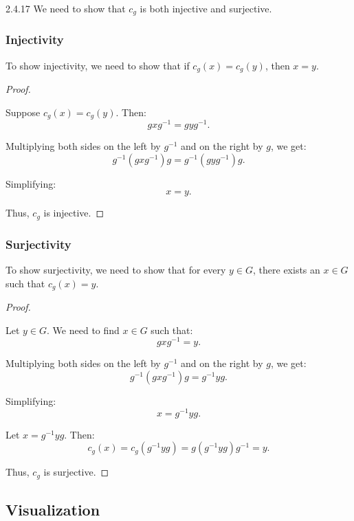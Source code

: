 \documentclass[12pt]{amsart}
\theoremstyle{definition}
\numberwithin{equation}{section}
\begin{document}
\begin{exercise}{2.4.17}
    We need to show that \(c_g\) is both injective and surjective.
    
    \subsubsection*{Injectivity}
    
    To show injectivity, we need to show that if \(c_g(x) = c_g(y)\), then \(x = y\).
    
    \begin{proof} \(\)
    
    Suppose \(c_g(x) = c_g(y)\). Then:
    \[
    gxg^{-1} = gyg^{-1}.
    \]
    
    Multiplying both sides on the left by \(g^{-1}\) and on the right by \(g\), we get:
    \[
    g^{-1}(gxg^{-1})g = g^{-1}(gyg^{-1})g.
    \]
    
    Simplifying:
    \[
    x = y.
    \]
    
    Thus, \(c_g\) is injective.
    
    \end{proof}
    
    \subsubsection*{Surjectivity}
    
    To show surjectivity, we need to show that for every \(y \in G\), there exists an \(x \in G\) such that \(c_g(x) = y\).
    
    \begin{proof} \(\)
    
    Let \(y \in G\). We need to find \(x \in G\) such that:
    \[
    gxg^{-1} = y.
    \]
    
    Multiplying both sides on the left by \(g^{-1}\) and on the right by \(g\), we get:
    \[
    g^{-1}(gxg^{-1})g = g^{-1}yg.
    \]
    
    Simplifying:
    \[
    x = g^{-1}yg.
    \]
    
    Let \(x = g^{-1}yg\). Then:
    \[
    c_g(x) = c_g(g^{-1}yg) = g(g^{-1}yg)g^{-1} = y.
    \]
    
    Thus, \(c_g\) is surjective.
    
    \end{proof}
    
    \subsection*{Visualization}


\end{exercise}
\end{document}

